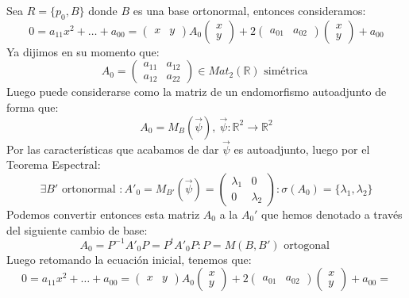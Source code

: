 \documentclass[10pt,a4paper,openright]{book}
\theoremstyle{break}
\begin{document}
Sea $R = \{p_0, B\}$ donde $B$ es una base ortonormal, entonces consideramos:
$$0 = a_{11}x^2 + \ldots + a_{00} = \begin{pmatrix} x & y \end{pmatrix} A_0 \begin{pmatrix} x \\ y \end{pmatrix} + 2 \begin{pmatrix} a_{01} & a_{02} \end{pmatrix} \begin{pmatrix} x \\ y \end{pmatrix} + a_{00}$$
Ya dijimos en su momento que:
$$A_0 = \begin{pmatrix}
a_{11} & a_{12} \\ a_{12} & a_{22}
\end{pmatrix} \in Mat_2 (\mathbb{R}) \mbox{ simétrica }$$
Luego puede considerarse como la matriz de un endomorfismo autoadjunto de forma que:
$$A_0 = M_B (\vec{\psi}), \ \vec{\psi} : \mathbb{R}^2 \to \mathbb{R}^2$$
Por las características que acabamos de dar $\vec{\psi}$ es autoadjunto, luego por el Teorema Espectral:
$$\exists B' \mbox{ ortonormal }: A'_0 = M_{B'} (\vec{\psi}) = \begin{pmatrix} \lambda_1 & 0 \\ 0 & \lambda_2 \end{pmatrix}:  \sigma(A_0) = \{\lambda_1, \lambda_2\}$$
Podemos convertir entonces esta matriz $A_0$ a la $A_0'$ que hemos denotado a través del siguiente cambio de base:
$$A_0 = P^{-1} A'_0 P = P^t A'_0 P : P = M(B, B') \mbox{ ortogonal }$$
Luego retomando la ecuación inicial, tenemos que:
$$0 = a_{11}x^2 + \ldots + a_{00} = \begin{pmatrix} x & y \end{pmatrix} A_0 \begin{pmatrix} x \\ y \end{pmatrix} + 2 \begin{pmatrix} a_{01} & a_{02} \end{pmatrix} \begin{pmatrix} x \\ y \end{pmatrix} + a_{00} =$$
\end{document}
